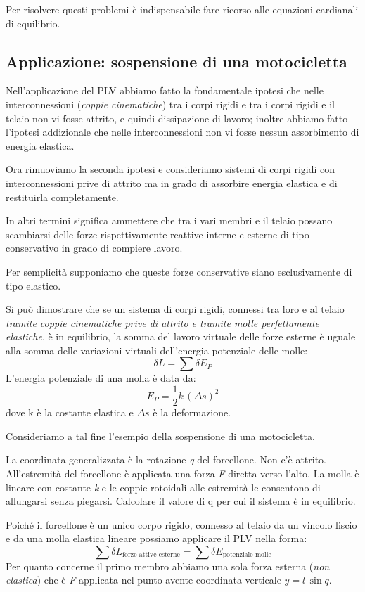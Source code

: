 	Per risolvere questi problemi è indispensabile fare ricorso alle equazioni cardianali di equilibrio.
	
	\subsection{Applicazione: sospensione di una motocicletta}
	
	 Nell'applicazione del PLV abbiamo fatto la fondamentale ipotesi che nelle interconnessioni (\emph{coppie cinematiche}) tra i corpi rigidi e tra i corpi rigidi e il telaio non vi fosse attrito, e quindi dissipazione di lavoro; inoltre abbiamo fatto l'ipotesi addizionale che nelle interconnessioni non vi fosse nessun assorbimento di energia elastica.
	 
	 Ora rimuoviamo la seconda ipotesi e consideriamo sistemi di corpi rigidi con interconnessioni prive di attrito ma in grado di assorbire energia elastica e di restituirla completamente.
	 
	 In altri termini significa ammettere che tra i vari membri e il telaio possano scambiarsi delle forze rispettivamente reattive interne e esterne di tipo conservativo in grado di compiere lavoro.
	 
	 Per semplicità supponiamo che queste forze conservative siano esclusivamente di tipo elastico.
	 
	 Si può dimostrare che se un sistema di corpi rigidi, connessi tra loro e al telaio \emph{tramite coppie cinematiche prive di attrito e tramite molle perfettamente elastiche}, è in equilibrio, la somma del lavoro virtuale delle forze esterne è uguale alla somma delle variazioni virtuali dell'energia potenziale delle molle:
	 \[\delta L = \sum \delta E_P\]
	 L'energia potenziale di una molla è data da:
	 \[E_P = \dfrac{1}{2}k\,(\Delta s)^2\]
	 dove k è la costante elastica e $\Delta s$ è la deformazione.
	 
	 Consideriamo a tal fine l'esempio della sospensione di una motocicletta.
	 
	 La coordinata generalizzata è la rotazione \emph{q} del forcellone. Non c'è attrito. All'estremità del forcellone è applicata una forza \emph{F} diretta verso l'alto. La molla è lineare con costante \emph{k} e le coppie rotoidali alle estremità le consentono di allungarsi senza piegarsi. Calcolare il valore di q per cui il sistema è in equilibrio. 
	 
	 Poiché il forcellone è un unico corpo rigido, connesso al telaio da un vincolo liscio e da una molla elastica lineare possiamo applicare il PLV nella forma:
	 \[\sum \delta L_{\text{forze attive esterne}} = \sum \delta E_{\text{potenziale molle}}\]
	Per quanto concerne il primo membro abbiamo una sola forza esterna (\emph{non elastica}) che è \emph{F} applicata nel punto avente coordinata verticale $y = l\,\sin{q}$.
	
